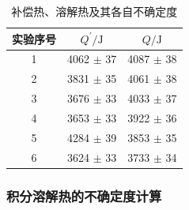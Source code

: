 \documentclass[cn,hazy,pku,12pt,normal,math=newtx,cite=super]{elegantnote}
\begin{document}
\begin{table}[htbp]
    \centering
    \caption{补偿热、溶解热及其各自不确定度}
    \begin{tabular}{ccc}
        \toprule
        实验序号 & $Q^\prime/\mathrm{J}$ & $Q/\mathrm{J}$ \\
        \midrule
        1 & 4062 $\pm$ 37 & 4087 $\pm$ 38 \\
        2 & 3831 $\pm$ 35 & 4061 $\pm$ 38 \\
        3 & 3676 $\pm$ 33 & 4033 $\pm$ 37 \\
        4 & 3653 $\pm$ 33 & 3922 $\pm$ 36 \\
        5 & 4284 $\pm$ 39 & 3853 $\pm$ 35 \\
        6 & 3624 $\pm$ 33 & 3733 $\pm$ 34 \\
        \bottomrule
    \end{tabular}
    \label{tab:13}
\end{table}

\subsubsection{积分溶解热的不确定度计算}\label{sec:1}
\end{document}
